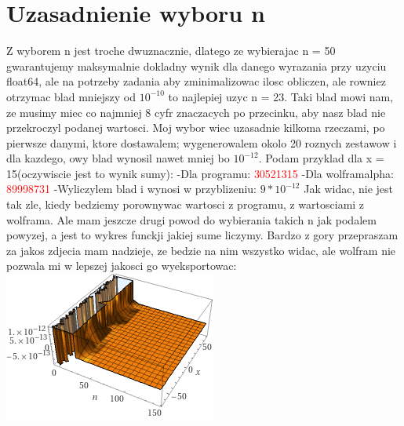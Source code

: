 \documentclass[a4paper,8pt]{article}
\begin{document}
\section{Uzasadnienie wyboru n}

Z wyborem n jest troche dwuznacznie, dlatego ze wybierajac n = 50 gwarantujemy maksymalnie dokladny wynik dla danego wyrazania przy uzyciu float64, ale na potrzeby zadania aby zminimalizowac ilosc obliczen, ale rowniez otrzymac blad mniejszy od $10^{-10}$ to najlepiej uzyc n = 23. Taki blad mowi nam, ze musimy miec co najmniej 8 cyfr znaczacych po przecinku, aby nasz blad nie przekroczyl podanej wartosci. 
\newline
Moj wybor wiec uzasadnie kilkoma rzeczami, po pierwsze danymi, ktore dostawalem; wygenerowalem okolo 20 roznych zestawow i dla kazdego, owy blad wynosil nawet mniej bo $10^{-12}$. Podam przyklad dla x = 15(oczywiscie jest to wynik sumy):
\quad -Dla programu:
\newline
{}\textcolor{red}{30521315}
\newline
\newline
\quad -Dla wolframalpha:
\newline
{}\textcolor{red}{89998731}
\newline
\newline
\quad -Wyliczylem blad i wynosi w przyblizeniu:
\newline
\newline
$9*10^{-12}$
\newline
Jak widac, nie jest tak zle, kiedy bedziemy porownywac wartosci z programu, z wartosciami z wolframa. Ale mam jeszcze drugi powod do wybierania takich n jak podalem powyzej, a jest to wykres funckji jakiej sume liczymy. Bardzo z gory przepraszam za jakos zdjecia mam nadzieje, ze bedzie na nim wszystko widac, ale wolfram nie pozwala mi w lepszej jakosci go wyeksportowac:
\newline
\includegraphics{wykres}
\end{document}
